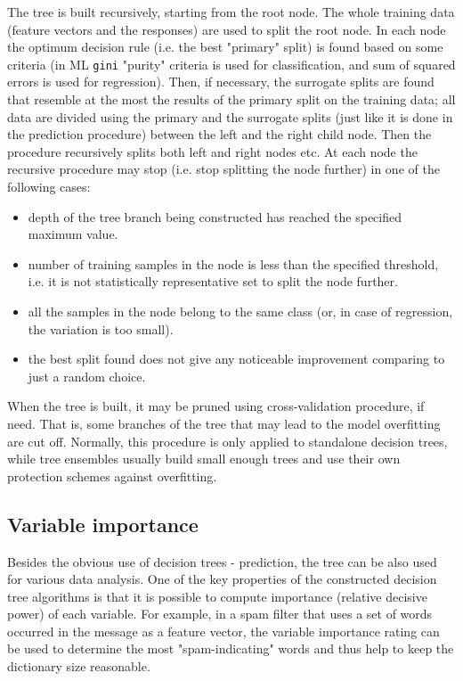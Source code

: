 The tree is built recursively, starting from the root node. The whole training data (feature vectors and the responses) are used to split the root node. In each node the optimum decision rule (i.e. the best "primary" split) is found based on some criteria (in ML \texttt{gini} "purity" criteria is used for classification, and sum of squared errors is used for regression). Then, if necessary, the surrogate splits are found that resemble at the most the results of the primary split on the training data; all data are divided using the primary and the surrogate splits (just like it is done in the prediction procedure) between the left and the right child node. Then the procedure recursively splits both left and right nodes etc. At each node the recursive procedure may stop (i.e. stop splitting the node further) in one of the following cases:
\begin{itemize}
\item{depth of the tree branch being constructed has reached the specified maximum value.}
\item{number of training samples in the node is less than the specified threshold, i.e. it is not statistically representative set to split the node further.}
\item{all the samples in the node belong to the same class (or, in case of regression, the variation is too small).}
\item{the best split found does not give any noticeable improvement comparing to just a random choice.}
\end{itemize}
When the tree is built, it may be pruned using cross-validation procedure, if need. That is, some branches of the tree that may lead to the model overfitting are cut off. Normally, this procedure is only applied to standalone decision trees, while tree ensembles usually build small enough trees and use their own protection schemes against overfitting.

\subsection{Variable importance}

Besides the obvious use of decision trees - prediction, the tree can be also used for various data analysis. One of the key properties of the constructed decision tree algorithms is that it is possible to compute importance (relative decisive power) of each variable. For example, in a spam filter that uses a set of words occurred in the message as a feature vector, the variable importance rating can be used to determine the most "spam-indicating" words and thus help to keep the dictionary size reasonable.

